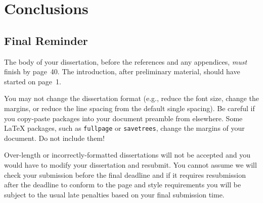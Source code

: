 \documentclass[logo,bsc,singlespacing,parskip]{infthesis}
\begin{document}
\chapter{Conclusions}

\section{Final Reminder}

The body of your dissertation, before the references and any appendices,
\emph{must} finish by page~40. The introduction, after preliminary material,
should have started on page~1.

You may not change the dissertation format (e.g., reduce the font size, change
the margins, or reduce the line spacing from the default single spacing). Be
careful if you copy-paste packages into your document preamble from elsewhere.
Some \LaTeX{} packages, such as \texttt{fullpage} or \texttt{savetrees}, change
the margins of your document. Do not include them!

Over-length or incorrectly-formatted dissertations will not be accepted and you
would have to modify your dissertation and resubmit. You cannot assume we will
check your submission before the final deadline and if it requires resubmission
after the deadline to conform to the page and style requirements you will be
subject to the usual late penalties based on your final submission time.










\end{document}
